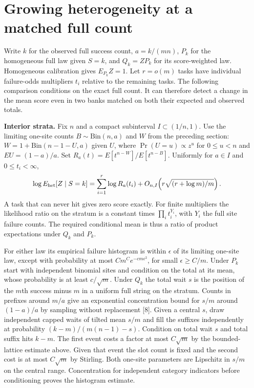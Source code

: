 \section*{Growing heterogeneity at a matched full count}
Write $k$ for the observed full success count, $a=k/(mn)$, $P_k$ for the homogeneous full law given $S=k$, and $Q_k=ZP_k$ for its score-weighted law. Homogeneous calibration gives $E_{P_k}Z=1$. Let $r=o(m)$ tasks have individual failure-odds multipliers $t_i$ relative to the remaining tasks. The following comparison conditions on the exact full count. It can therefore detect a change in the mean score even in two banks matched on both their expected and observed totals.

\textbf{Interior strata.} Fix $n$ and a compact subinterval $I\subset(1/n,1)$. Use the limiting one-site counts $B\sim\mathrm{Bin}(n,a)$ and $W$ from the preceding section: $W=1+\mathrm{Bin}(n-1-U,a)$ given $U$, where $\Pr(U=u)\propto z^u$ for $0\le u<n$ and $EU=(1-a)/a$. Set $R_a(t)=E[t^{n-W}]/E[t^{n-B}]$. Uniformly for $a\in I$ and $0\le t_i<\infty$,
\[
 \log E_{\rm het}[Z\mid S=k]=\sum_{i=1}^r\log R_a(t_i)
      + O_{n,I}\!\left(r\sqrt{(r+\log m)/m}\right).
\]
A task that can never hit gives zero score exactly. For finite multipliers the likelihood ratio on the stratum is a constant times $\prod_i t_i^{Y_i}$, with $Y_i$ the full site failure counts. The required conditional mean is thus a ratio of product expectations under $Q_k$ and $P_k$.

For either law its empirical failure histogram is within $\epsilon$ of its limiting one-site law, except with probability at most $C m^C e^{-c m\epsilon^2}$, for small $\epsilon\ge C/m$. Under $P_k$ start with independent binomial sites and condition on the total at its mean, whose probability is at least $c/\sqrt m$. Under $Q_k$ the total wait $s$ is the position of the $m$th success minus $m$ in a uniform full string on the stratum. Counts in prefixes around $m/a$ give an exponential concentration bound for $s/m$ around $(1-a)/a$ by sampling without replacement [8]. Given a central $s$, draw independent capped waits of tilted mean $s/m$ and fill the suffixes independently at probability $(k-m)/(m(n-1)-s)$. Condition on total wait $s$ and total suffix hits $k-m$. The first event costs a factor at most $C\sqrt m$ by the bounded-lattice estimate above. Given that event the slot count is fixed and the second cost is at most $C\sqrt m$ by Stirling. Both one-site parameters are Lipschitz in $s/m$ on the central range. Concentration for independent category indicators before conditioning proves the histogram estimate.

